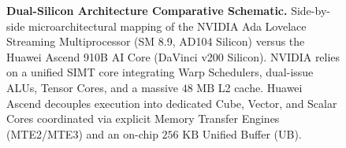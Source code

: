 \begin{figure}[!t]
{%
}
\caption[Dual-Silicon Architecture Comparative Schematic]{\textbf{Dual-Silicon Architecture Comparative Schematic.} Side-by-side microarchitectural mapping of the NVIDIA Ada Lovelace Streaming Multiprocessor (SM 8.9, AD104 Silicon) versus the Huawei Ascend 910B AI Core (DaVinci v200 Silicon). NVIDIA relies on a unified SIMT core integrating Warp Schedulers, dual-issue ALUs, Tensor Cores, and a massive $48\text{ MB}$ L2 cache. Huawei Ascend decouples execution into dedicated Cube, Vector, and Scalar Cores coordinated via explicit Memory Transfer Engines (MTE2/MTE3) and an on-chip $256\text{ KB}$ Unified Buffer (UB).}
\label{fig:dual_silicon_schematic}
\end{figure}

